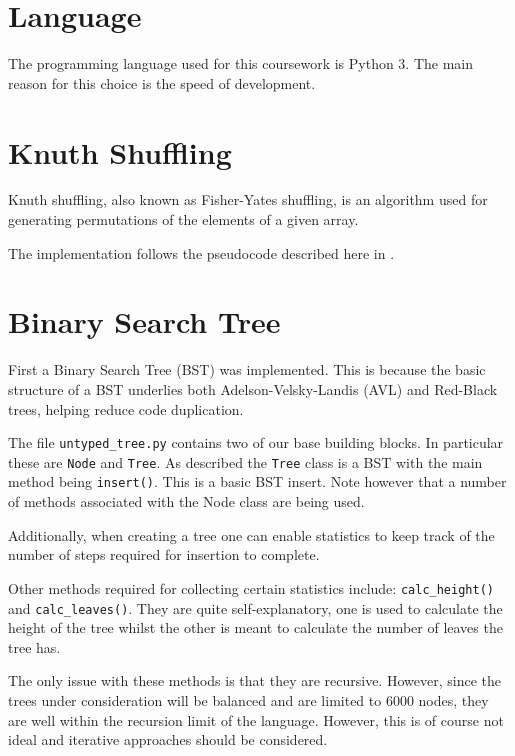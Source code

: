 \documentclass[article]{uom-coursework}
\begin{document}
\section{Language}

The programming language used for this coursework is Python 3.
The main reason for this choice is the speed of development.

\section{Knuth Shuffling}



Knuth shuffling, also known as Fisher-Yates shuffling, is an
algorithm used for generating permutations of the elements of a
given array.

The implementation follows the pseudocode described here in
\textcite{wikifisheryates}.

\section{Binary Search Tree}

First a Binary Search Tree (BST) was implemented. This is
because the basic structure of a BST underlies both
Adelson-Velsky-Landis (AVL) and Red-Black trees, helping reduce
code duplication.

The file \texttt{untyped\_tree.py} contains two of our base
building blocks. In particular these are \texttt{Node} and
\texttt{Tree}. As described the \texttt{Tree} class is a BST
with the main method being \texttt{insert()}. This is a basic
BST insert. Note however that a number of methods associated
with the Node class are being used.

Additionally, when creating a tree one can enable statistics to
keep track of the number of steps required for insertion to
complete.

Other methods required for collecting certain statistics
include: \texttt{calc\_height()} and \texttt{calc\_leaves()}.
They are quite self-explanatory, one is used to calculate the
height of the tree whilst the other is meant to calculate the
number of leaves the tree has.

The only issue with these methods is that they are recursive.
However, since the trees under consideration will be balanced
and are limited to 6000 nodes, they are well within the
recursion limit of the language. However, this is of course not
ideal and iterative approaches should be considered.
\end{document}
